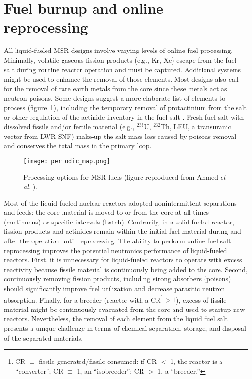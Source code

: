 \section{Fuel burnup and online reprocessing}
All liquid-fueled \gls{MSR} designs involve varying levels of online fuel 
processing. Minimally, volatile gaseous fission products (e.g., Kr, Xe) 
escape from the fuel salt during routine reactor operation and must be 
captured. Additional systems might be used to enhance the removal of those 
elements. Most designs also call for the removal of rare earth metals from 
the core since these metals act as neutron poisons. Some designs suggest a 
more elaborate list of elements to process (figure~\ref{fig:periodic_tab}), 
including the temporary removal of protactinium from the salt or other 
regulation of the actinide inventory in the fuel salt 
\cite{ahmad_neutronics_2015}. Fresh fuel salt with dissolved fissile and/or 
fertile material (e.g., $^{233}$U, $^{232}$Th, \gls{LEU}, a transuranic 
vector from \gls{LWR} \gls{SNF}) make-up the salt mass loss caused by poisons 
removal and conserves the total mass in the primary loop.
\begin{figure}[htp!] %
  \centering
  \texttt{[image: periodic\_map.png]}
  \caption{Processing options for \gls{MSR} fuels (figure reproduced from 
  Ahmed \emph{et al.} \cite{ahmad_neutronics_2015}).}
  \label{fig:periodic_tab}
\end{figure}

Most of the liquid-fueled nuclear reactors adopted nonintermittent 
separations and feeds: the core material is moved to or from the core at all 
times (continuous) or specific intervals (batch). Contrarily, in a 
solid-fueled reactor, fission products and actinides remain within the initial 
fuel material during and after the operation until reprocessing. The ability 
to perform online fuel salt reprocessing improves the potential neutronics 
performance of liquid-fueled reactors. First, it is unnecessary for 
liquid-fueled reactors to operate with excess reactivity because fissile 
material is continuously being added to the core. Second, continuously 
removing fission products, including strong absorbers (poisons) should 
significantly improve fuel utilization and decrease parasitic neutron 
absorption. Finally, for a breeder (reactor with a \gls{CR}\footnote{\gls{CR} 
$\equiv$ fissile generated/fissile consumed: if CR $<$ 1, the reactor is a 
``converter''; CR $\equiv$ 1, an ``isobreeder''; CR $>$ 1, a 
``breeder.''}$>1$), excess of fissile material might be continuously evacuated 
from the core and used to startup new reactors. Nevertheless, the removal of 
each element from the liquid fuel salt presents a unique challenge in terms of 
chemical separation, storage, and disposal of the separated materials.

